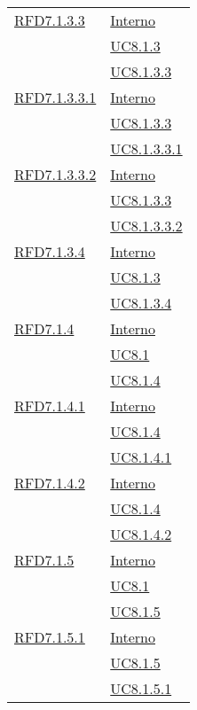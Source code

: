 \begin{longtable}{|>{\centering}m{5cm}|m{5cm}<{\centering}|}
\hyperlink{RFD7.1.3.3}{RFD7.1.3.3} & \hyperlink{Interno}{Interno}\\
& \hyperref[UC8.1.3]{UC8.1.3}\\
& \hyperref[UC8.1.3.3]{UC8.1.3.3}\\ \hline

\hyperlink{RFD7.1.3.3.1}{RFD7.1.3.3.1} & \hyperlink{Interno}{Interno}\\
& \hyperref[UC8.1.3.3]{UC8.1.3.3}\\
& \hyperref[UC8.1.3.3.1]{UC8.1.3.3.1}\\ \hline

\hyperlink{RFD7.1.3.3.2}{RFD7.1.3.3.2} & \hyperlink{Interno}{Interno}\\
& \hyperref[UC8.1.3.3]{UC8.1.3.3}\\
& \hyperref[UC8.1.3.3.2]{UC8.1.3.3.2}\\ \hline

\hyperlink{RFD7.1.3.4}{RFD7.1.3.4} & \hyperlink{Interno}{Interno}\\
& \hyperref[UC8.1.3]{UC8.1.3}\\
& \hyperref[UC8.1.3.4]{UC8.1.3.4}\\ \hline

\hyperlink{RFD7.1.4}{RFD7.1.4} & \hyperlink{Interno}{Interno}\\
& \hyperref[UC8.1]{UC8.1}\\
& \hyperref[UC8.1.4]{UC8.1.4}\\ \hline

\hyperlink{RFD7.1.4.1}{RFD7.1.4.1} & \hyperlink{Interno}{Interno}\\
& \hyperref[UC8.1.4]{UC8.1.4}\\
& \hyperref[UC8.1.4.1]{UC8.1.4.1}\\ \hline

\hyperlink{RFD7.1.4.2}{RFD7.1.4.2} & \hyperlink{Interno}{Interno}\\
& \hyperref[UC8.1.4]{UC8.1.4}\\
& \hyperref[UC8.1.4.2]{UC8.1.4.2}\\ \hline

\hyperlink{RFD7.1.5}{RFD7.1.5} & \hyperlink{Interno}{Interno}\\
& \hyperref[UC8.1]{UC8.1}\\
& \hyperref[UC8.1.5]{UC8.1.5}\\ \hline

\hyperlink{RFD7.1.5.1}{RFD7.1.5.1} & \hyperlink{Interno}{Interno}\\
& \hyperref[UC8.1.5]{UC8.1.5}\\
& \hyperref[UC8.1.5.1]{UC8.1.5.1}\\ \hline


\end{longtable}
